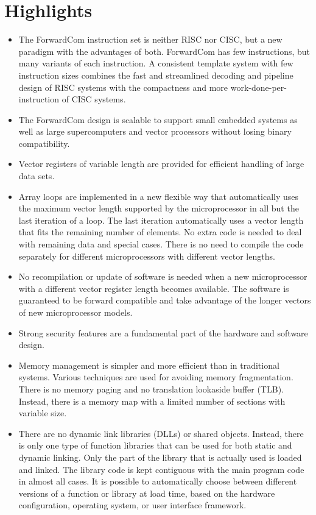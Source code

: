 \documentclass[forwardcom.tex]{subfiles}
\begin{document}
\section{Highlights}
\begin{itemize}
\item The ForwardCom instruction set is neither RISC nor CISC, but a new paradigm with the advantages of both. ForwardCom has few instructions, but many variants of each instruction. A consistent template system with few instruction sizes combines the fast and streamlined decoding and pipeline design of RISC systems with the compactness and more work-done-per-instruction of CISC systems. 

\item The ForwardCom design is scalable to support small embedded systems as well as large supercomputers and vector processors without losing binary compatibility.

\item Vector registers of variable length are provided for efficient handling of large data sets.

\item Array loops are implemented  in a new flexible way that automatically uses the maximum vector length supported by the microprocessor in all but the last iteration of a loop. The last iteration automatically uses a vector length that fits the remaining number of elements. No extra code is needed to deal with remaining data and special cases. There is no need to compile the code separately for different microprocessors with different vector lengths.

\item No recompilation or update of software is needed when a new microprocessor with a different vector register length becomes available. The software is guaranteed to be forward compatible and take advantage of the longer vectors
of new microprocessor models.

\item Strong security features are a fundamental part of the hardware and software design.

\item Memory management is simpler and more efficient than in traditional systems. 
Various techniques are used for avoiding memory 
fragmentation. There is no memory paging and no translation lookaside buffer (TLB). Instead, there is a memory map with a limited number of sections with variable size.

\item There are no dynamic link libraries (DLLs) or shared objects. Instead, there is only one type of function libraries 
that can be used for both static and dynamic linking. Only the part of the library that is actually used is loaded and linked. The library code is kept contiguous with the main program code in almost all cases. It is possible to automatically choose between different versions of a function or library at load time, based on the hardware configuration, operating system, or user interface framework.


\end{itemize}
\end{document}
